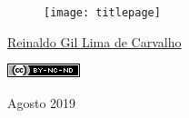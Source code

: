 \thispagestyle{empty}

\begin{center}
  \begin{figure}[H]
    \begin{center}
      \hspace{-1cm}
      \texttt{[image: titlepage]}
  ~\cite{FrontPageIMG}
    \end{center}      
  \end{figure}

  \vskip 2cm

  \hspace{-1cm}
  \begin{minipage}[c]{17cm}
    \begin{center}

{\huge {}\vskip 0.15cm %

{\large \href{http://reinaldoc.wordpress.com}{Reinaldo Gil Lima de Carvalho}} %

{\includegraphics[width=0.1\columnwidth]{imgs/license-CC-BY-NC-ND_header.png}}

}
    \end{center}
  \end{minipage}

  \vskip 14cm

  {\huge Agosto 2019} %
\end{center}
